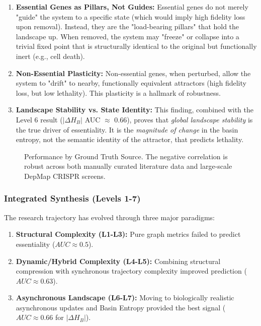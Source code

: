 \begin{enumerate}
    \item \textbf{Essential Genes as Pillars, Not Guides:} Essential genes do not merely "guide" the system to a specific state (which would imply high fidelity loss upon removal). Instead, they are the "load-bearing pillars" that hold the landscape up. When removed, the system may "freeze" or collapse into a trivial fixed point that is structurally identical to the original but functionally inert (e.g., cell death).
    \item \textbf{Non-Essential Plasticity:} Non-essential genes, when perturbed, allow the system to "drift" to nearby, functionally equivalent attractors (high fidelity loss, but low lethality). This plasticity is a hallmark of robustness.
    \item \textbf{Landscape Stability vs. State Identity:} This finding, combined with the Level 6 result ($|\Delta H_B|$ AUC $\approx$ 0.66), proves that \textit{global landscape stability} is the true driver of essentiality. It is the \textit{magnitude of change} in the basin entropy, not the semantic identity of the attractor, that predicts lethality.
\end{enumerate}

\begin{figure}[H]
    \centering
    \caption{Performance by Ground Truth Source. The negative correlation is robust across both manually curated literature data and large-scale DepMap CRISPR screens.}
    \label{fig:source_comp}
\end{figure}

\subsubsection{Integrated Synthesis (Levels 1-7)}
The research trajectory has evolved through three major paradigms:

\begin{enumerate}
    \item \textbf{Structural Complexity (L1-L3):} Pure graph metrics failed to predict essentiality ($AUC \approx 0.5$).
    \item \textbf{Dynamic/Hybrid Complexity (L4-L5):} Combining structural compression with synchronous trajectory complexity improved prediction ($AUC \approx 0.63$).
    \item \textbf{Asynchronous Landscape (L6-L7):} Moving to biologically realistic asynchronous updates and Basin Entropy provided the best signal ($AUC \approx 0.66$ for $|\Delta H_B|$).
\end{enumerate}

